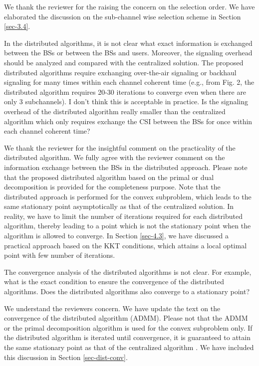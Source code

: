 \resp We thank the reviewer for the raising the concern on the selection order. We have elaborated the discussion on the sub-channel wise selection scheme in Section \ref{sec-3.4}. 

 In the distributed algorithms, it is not clear what exact information is exchanged between the BSs or between the BSs and users. Moreover, the signaling overhead should be analyzed and compared with the centralized solution. The proposed distributed algorithms require exchanging over-the-air signaling or backhaul signaling for many times within each channel coherent time (e.g., from Fig. 2, the distributed algorithm requires 20-30 iterations to converge even when there are only 3 subchannels). I don’t think this is acceptable in practice. Is the signaling overhead of the distributed algorithm really smaller than the centralized algorithm which only requires exchange the CSI between the BSs for once within each channel coherent time?

\resp We thank the reviewer for the insightful comment on the practicality of the distributed algorithm. We fully agree with the reviewer comment on the information exchange between the BSs in the distributed approach. Please note that the proposed distributed algorithm based on the primal or dual decomposition is provided for the completeness purpose. Note that the distributed approach is performed for the convex subproblem, which leads to the same stationary point asymptotically as that of the centralized solution. In reality, we have to limit the number of iterations required for each distributed algorithm, thereby leading to a point which is not the stationary point when the algorithm is allowed to converge. In Section \ref{sec-4.3}, we have discussed a practical approach based on the KKT conditions, which attains a local optimal point with few number of iterations.

 The convergence analysis of the distributed algorithms is not clear. For example, what is the exact condition to ensure the convergence of the distributed algorithms. Does the distributed algorithms also converge to a stationary point?

\resp We understand the reviewers concern. We have update the text on the convergence of the distributed algorithm (ADMM). Please not that the ADMM or the primal decomposition algorithm is used for the convex subproblem only. If the distributed algorithm is iterated until convergence, it is guaranteed to attain the same stationary point as that of the centralized algorithm \cite{boyd2011distributed}. We have included this discussion in Section \ref{sec-dist-conv}.

